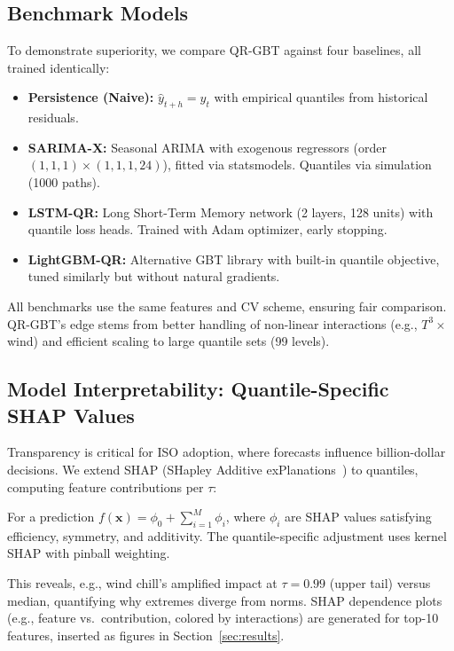 \documentclass[12pt,a4paper]{article}
\begin{document}
\subsection{Benchmark Models}

To demonstrate superiority, we compare QR-GBT against four baselines, all trained identically:
\begin{itemize}[leftmargin=*,nosep]
    \item \textbf{Persistence (Naive):} $\hat{y}_{t+h} = y_t$ with empirical quantiles from historical residuals.
    \item \textbf{SARIMA-X:} Seasonal ARIMA with exogenous regressors (order $(1,1,1)\times(1,1,1,24)$), fitted via statsmodels. Quantiles via simulation (1000 paths).
    \item \textbf{LSTM-QR:} Long Short-Term Memory network (2 layers, 128 units) with quantile loss heads. Trained with Adam optimizer, early stopping.
    \item \textbf{LightGBM-QR:} Alternative GBT library with built-in quantile objective, tuned similarly but without natural gradients.
\end{itemize}

All benchmarks use the same features and CV scheme, ensuring fair comparison. QR-GBT's edge stems from better handling of non-linear interactions (e.g., $T^3 \times$ wind) and efficient scaling to large quantile sets (99 levels).

\subsection{Model Interpretability: Quantile-Specific SHAP Values}

Transparency is critical for ISO adoption, where forecasts influence billion-dollar decisions. We extend SHAP (SHapley Additive exPlanations~\cite{lundberg2017unified}) to quantiles, computing feature contributions per $\tau$:

For a prediction $f(\mathbf{x}) = \phi_0 + \sum_{i=1}^{M} \phi_i$, where $\phi_i$ are SHAP values satisfying efficiency, symmetry, and additivity. The quantile-specific adjustment uses kernel SHAP with pinball weighting.

This reveals, e.g., wind chill's amplified impact at $\tau=0.99$ (upper tail) versus median, quantifying why extremes diverge from norms. SHAP dependence plots (e.g., feature vs.\ contribution, colored by interactions) are generated for top-10 features, inserted as figures in Section~\ref{sec:results}.
\end{document}
